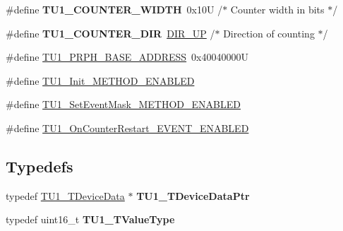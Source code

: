 \begin{DoxyCompactItemize}
\item 
\mbox{\label{group___t_u1__module_ga1f7080987fb558b36a77447a61d7ec4a}} 
\#define {\bfseries T\+U1\+\_\+\+C\+O\+U\+N\+T\+E\+R\+\_\+\+W\+I\+D\+TH}~0x10\+U       /$\ast$ Counter width in bits  $\ast$/
\item 
\mbox{\label{group___t_u1__module_ga199a6b62d73e2782f77ac6c4f7a5ea41}} 
\#define {\bfseries T\+U1\+\_\+\+C\+O\+U\+N\+T\+E\+R\+\_\+\+D\+IR}~\hyperlink{group___p_e___types__module_gga89181fe4df1c4701239176768b4a9ce5a0b76fb863426c07c6c997a8d9523257b}{D\+I\+R\+\_\+\+UP}      /$\ast$ Direction of counting $\ast$/
\item 
\#define \hyperlink{group___t_u1__module_ga791d7a56f94f745b0dbb9a0ff09ee0d4}{T\+U1\+\_\+\+P\+R\+P\+H\+\_\+\+B\+A\+S\+E\+\_\+\+A\+D\+D\+R\+E\+SS}~0x40040000U
\item 
\#define \hyperlink{group___t_u1__module_ga2532ba47f579738a2f954e79d2d99e9d}{T\+U1\+\_\+\+Init\+\_\+\+M\+E\+T\+H\+O\+D\+\_\+\+E\+N\+A\+B\+L\+ED}
\item 
\#define \hyperlink{group___t_u1__module_gad5683773669c6d1a98cc77b56ccbc9e8}{T\+U1\+\_\+\+Set\+Event\+Mask\+\_\+\+M\+E\+T\+H\+O\+D\+\_\+\+E\+N\+A\+B\+L\+ED}
\item 
\#define \hyperlink{group___t_u1__module_ga776fe3d89696e57b98cf36b71dbcc86c}{T\+U1\+\_\+\+On\+Counter\+Restart\+\_\+\+E\+V\+E\+N\+T\+\_\+\+E\+N\+A\+B\+L\+ED}
\end{DoxyCompactItemize}
\subsection*{Typedefs}
\begin{DoxyCompactItemize}
\item 
\mbox{\label{group___t_u1__module_ga992897b60934aa5b8d6edb262c3bba55}} 
typedef \hyperlink{struct_t_u1___t_device_data}{T\+U1\+\_\+\+T\+Device\+Data} $\ast$ {\bfseries T\+U1\+\_\+\+T\+Device\+Data\+Ptr}
\item 
\mbox{\label{group___t_u1__module_ga10e196ba4fbf739bb461e1e9379ab405}} 
typedef uint16\+\_\+t {\bfseries T\+U1\+\_\+\+T\+Value\+Type}
\end{DoxyCompactItemize}
